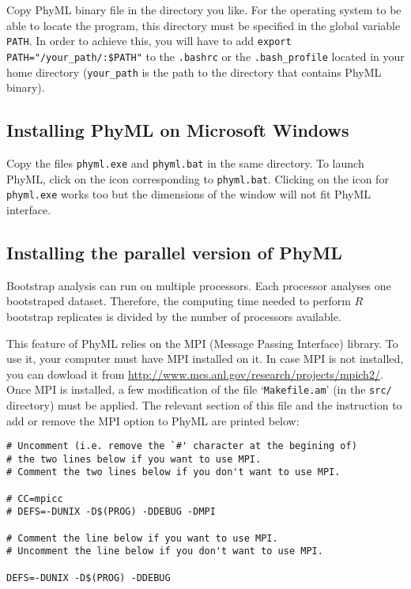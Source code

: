 \documentclass[a4paper,12pt]{article}
\newcommand{\x}[1]{\texttt{#1}}
\begin{document}
Copy PhyML binary file in the directory you like.  For the operating system to be able to locate the
program, this directory must be specified in the global variable \x{PATH}. In order to achieve this,
you  will   have  to  add  \x{export   PATH="/your\_path/:\${PATH}"}  to  the   \x{.bashrc}  or  the
\x{.bash\_profile} located in your home directory  (\x{your\_path} is the path to the directory that
contains PhyML binary).


\subsection{Installing PhyML on Microsoft Windows}\label{sec:install_windows}

Copy the files \x{phyml.exe} and \x{phyml.bat} in  the same directory. To launch PhyML, click on the
icon  corresponding to \x{phyml.bat}.   Clicking on  the icon  for \x{phyml.exe}  works too  but the
dimensions of the window will not fit PhyML interface.

\subsection{Installing the parallel version of PhyML}\label{sec:MPI}

Bootstrap analysis can run on multiple  processors. Each processor analyses one bootstraped dataset.
Therefore, the computing time needed to perform $R$ bootstrap replicates is divided by the number of
processors available.

This  feature of  PhyML relies  on the  MPI (Message  Passing Interface)  library. To  use  it, your
computer must  have MPI  installed on  it. In case  MPI is  not installed, you  can dowload  it from
\href{http://www.mcs.anl.gov/research/projects/mpich2/}{http://www.mcs.anl.gov/research/projects/mpich2/}.
Once  MPI is  installed, a  few modification  of the  file `\x{Makefile.am}' (in the \x{src/}
directory) must be  applied.  The
relevant section  of this file  and the  instruction to add  or remove the  MPI option to  PhyML are
printed below:

\begin{verbatim}
# Uncomment (i.e. remove the `#' character at the begining of) 
# the two lines below if you want to use MPI.
# Comment the two lines below if you don't want to use MPI.

# CC=mpicc
# DEFS=-DUNIX -D$(PROG) -DDEBUG -DMPI

# Comment the line below if you want to use MPI.
# Uncomment the line below if you don't want to use MPI.

DEFS=-DUNIX -D$(PROG) -DDEBUG
\end{verbatim}
\end{document}
